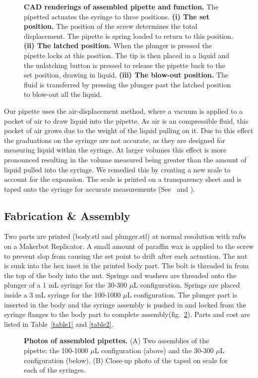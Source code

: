 \documentclass[10pt,letterpaper]{article}
\begin{document}
\begin{figure}
	\caption{
		{\bf CAD renderings of assembled pipette and function.} The pipetted actuates the syringe to three positions. {\bf(i) The set position.} The position of the screw determines the total displacement. The pipette is spring loaded to return to this position. {\bf (ii) The latched position.} When the plunger is pressed the pipette locks at this position. The tip is then placed in a liquid and the unlatching button is pressed to release the pipette back to the set position, drawing in liquid. {\bf (iii) The blow-out position.} The fluid is transferred by pressing the plunger past the latched position to blow-out all the liquid.
	}
	\label{fig2}
\end{figure}

Our pipette uses the air-displacement method, where a vacuum is applied to a pocket of air to draw liquid into the pipette.
As air is an compressible fluid, this pocket of air grows due to the weight of the liquid pulling on it.
Due to this effect the graduations on the syringe are not accurate, as they are designed for measuring liquid within the syringe.
At larger volumes this effect is more pronounced resulting in the volume measured being greater than the amount of liquid pulled into the syringe.
We remedied this by creating a new scale to account for the expansion.
The scale is printed on a transparency sheet and is taped onto the syringe for accurate measurements (See~ and ).

\subsection*{Fabrication \& Assembly}
Two parts are printed (body.stl and plunger.stl) at normal resolution with rafts on a Makerbot Replicator.
A small amount of paraffin wax is applied to the screw to prevent slop from causing the set point to drift after each actuation.
The nut is sunk into the hex inset in the printed body part.
The bolt is threaded in from the top of the body into the nut.
Springs and washers are threaded onto the plunger of a 1 mL syringe for the 30-300 $\mu$L configuration.
Springs are placed inside a 3 mL syringe for the 100-1000 $\mu$L configuration.
The plunger part is inserted in the body and the syringe assembly is pushed in and locked from the syringe flanges to the body part to complete assembly(fig.~\ref{fig3}).
Parts and cost are listed in Table~\ref{table1} and \ref{table2}.

\begin{figure}
	\caption{
		{\bf Photos of assembled pipettes.}  (A) Two assemblies of the pipette: the 100-1000 $\mu$L configuration (above) and the 30-300 $\mu$L configuration (below). (B) Close-up photo of the taped on scale for each of the syringes. 
	}
	\label{fig3}
\end{figure}
\end{document}
